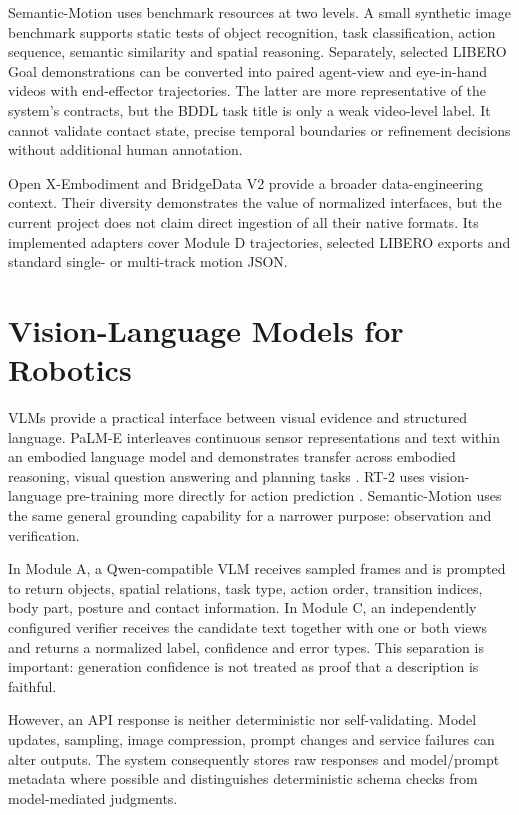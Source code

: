 \documentclass[11pt,oneside]{report}
\begin{document}
Semantic-Motion uses benchmark resources at two levels. A small synthetic image
benchmark supports static tests of object recognition, task classification,
action sequence, semantic similarity and spatial reasoning. Separately,
selected LIBERO Goal demonstrations can be converted into paired agent-view and
eye-in-hand videos with end-effector trajectories. The latter are more
representative of the system's contracts, but the BDDL task title is only a
weak video-level label. It cannot validate contact state, precise temporal
boundaries or refinement decisions without additional human annotation.

Open X-Embodiment \cite{openx2024} and BridgeData V2
\cite{walke2023bridgedatav2} provide a broader data-engineering context. Their
diversity demonstrates the value of normalized interfaces, but the current
project does not claim direct ingestion of all their native formats. Its
implemented adapters cover Module D trajectories, selected LIBERO exports and
standard single- or multi-track motion JSON.

\section{Vision-Language Models for Robotics}
VLMs provide a practical interface between visual evidence and structured
language. PaLM-E interleaves continuous sensor representations and text within
an embodied language model and demonstrates transfer across embodied reasoning,
visual question answering and planning tasks \cite{driess2023palme}. RT-2 uses
vision-language pre-training more directly for action prediction
\cite{zitkovich2023rt2}. Semantic-Motion uses the same general grounding
capability for a narrower purpose: observation and verification.

In Module A, a Qwen-compatible VLM receives sampled frames and is prompted to
return objects, spatial relations, task type, action order, transition indices,
body part, posture and contact information. In Module C, an independently
configured verifier receives the candidate text together with one or both
views and returns a normalized label, confidence and error types. This
separation is important: generation confidence is not treated as proof that a
description is faithful.

However, an API response is neither deterministic nor self-validating. Model
updates, sampling, image compression, prompt changes and service failures can
alter outputs. The system consequently stores raw responses and model/prompt
metadata where possible and distinguishes deterministic schema checks from
model-mediated judgments.
\end{document}
